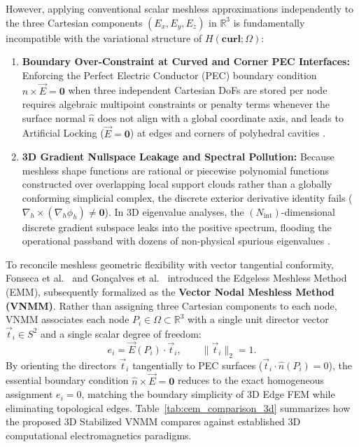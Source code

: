 \documentclass[preprint,12pt]{elsarticle}
\newcommand{\R}{\mathbb{R}}
\newcommand{\Hcurl}{H(\mathbf{curl};\Omega)}
\begin{document}
However, applying conventional scalar meshless approximations independently to the three Cartesian components $(E_x, E_y, E_z)$ in $\R^3$ is fundamentally incompatible with the variational structure of $\Hcurl$:
\begin{enumerate}
    \item \textbf{Boundary Over-Constraint at Curved and Corner PEC Interfaces:} Enforcing the Perfect Electric Conductor (PEC) boundary condition $\hat{n} \times \vec{E} = \mathbf{0}$ when three independent Cartesian DoFs are stored per node requires algebraic multipoint constraints or penalty terms whenever the surface normal $\hat{n}$ does not align with a global coordinate axis, and leads to Artificial Locking ($\vec{E} = \mathbf{0}$) at edges and corners of polyhedral cavities \cite{Costabel2000, Jin2014}.
    \item \textbf{3D Gradient Nullspace Leakage and Spectral Pollution:} Because meshless shape functions are rational or piecewise polynomial functions constructed over overlapping local support clouds rather than a globally conforming simplicial complex, the discrete exterior derivative identity fails ($\nabla_h \times (\nabla_h \phi_h) \neq \mathbf{0}$). In 3D eigenvalue analyses, the $(N_{\text{int}})$-dimensional discrete gradient subspace leaks into the positive spectrum, flooding the operational passband with dozens of non-physical spurious eigenvalues \cite{Boffi2010, Fernandes2012}.
\end{enumerate}

To reconcile meshless geometric flexibility with vector tangential conformity, Fonseca et al.\ \cite{Fonseca2008} and Gonçalves et al.\ \cite{Goncalves2020, Goncalves2021} introduced the Edgeless Meshless Method (EMM), subsequently formalized as the \textbf{Vector Nodal Meshless Method (VNMM)}. Rather than assigning three Cartesian components to each node, VNMM associates each node $P_i \in \Omega \subset \R^3$ with a single unit director vector $\vec{t}_i \in S^2$ and a single scalar degree of freedom:
\begin{equation}
    e_i = \vec{E}(P_i) \cdot \vec{t}_i, \qquad \|\vec{t}_i\|_2 = 1.
    \label{eq:nodal_dof_3d}
\end{equation}
By orienting the directors $\vec{t}_i$ tangentially to PEC surfaces ($\vec{t}_i \cdot \hat{n}(P_i) = 0$), the essential boundary condition $\hat{n} \times \vec{E} = \mathbf{0}$ reduces to the exact homogeneous assignment $e_i = 0$, matching the boundary simplicity of 3D Edge FEM while eliminating topological edges. Table~\ref{tab:cem_comparison_3d} summarizes how the proposed 3D Stabilized VNMM compares against established 3D computational electromagnetics paradigms.
\end{document}
